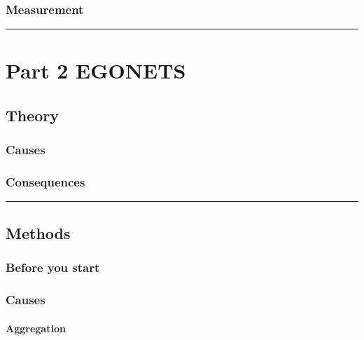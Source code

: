 \documentclass[
]{book}
\begin{document}
\hypertarget{measurement}{%
\section{Measurement}\label{measurement}}

\begin{center}\rule{0.5\linewidth}{0.5pt}\end{center}

\hypertarget{part-part-2-egonets}{%
\part{Part 2 EGONETS}\label{part-part-2-egonets}}

\hypertarget{theory-1}{%
\chapter{Theory}\label{theory-1}}

\hypertarget{causes-1}{%
\section{Causes}\label{causes-1}}

\hypertarget{consequences-1}{%
\section{Consequences}\label{consequences-1}}

\begin{center}\rule{0.5\linewidth}{0.5pt}\end{center}

\hypertarget{methods-1}{%
\chapter{Methods}\label{methods-1}}

\hypertarget{before-you-start-1}{%
\section{Before you start}\label{before-you-start-1}}

\hypertarget{causes-2}{%
\section{Causes}\label{causes-2}}

\hypertarget{aggregation}{%
\subsection{Aggregation}\label{aggregation}}
\end{document}
